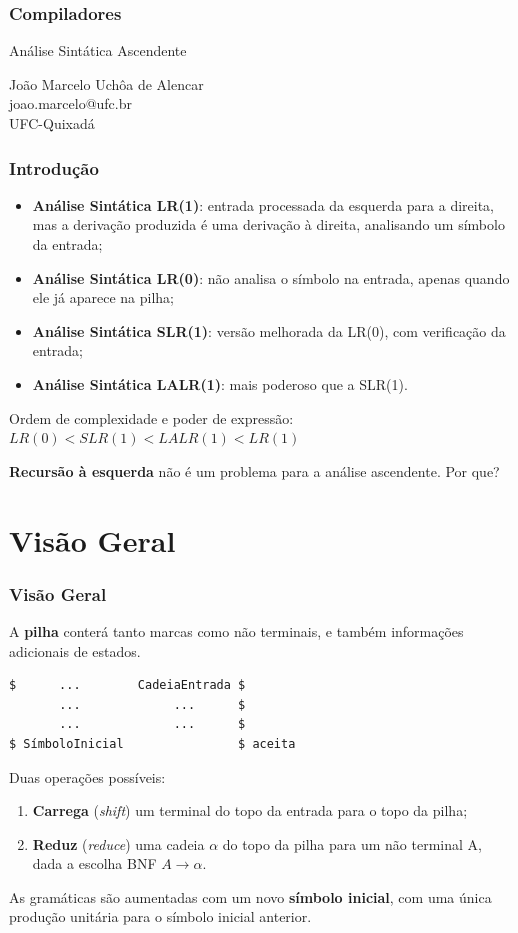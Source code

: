 \documentclass[table]{beamer}
\begin{document}
\begin{frame}
   \frametitle{Compiladores}
   \large
   \begin{center}
   Análise Sintática Ascendente
   \end{center}
   \scriptsize
   \begin{center}
      João Marcelo Uchôa de Alencar \\
      joao.marcelo@ufc.br \\
      UFC-Quixadá
   \end{center}
\end{frame}

\begin{frame}
   \frametitle{Introdução}
   \begin{itemize}
      \item \textbf{Análise Sintática LR(1)}: entrada processada da esquerda para a direita, mas a derivação produzida é uma derivação à direita, analisando um símbolo da entrada;
      \item \textbf{Análise Sintática LR(0)}: não analisa o símbolo na entrada, apenas quando ele já aparece na pilha;
      \item \textbf{Análise Sintática SLR(1)}: versão melhorada da LR(0), com verificação da entrada;
      \item \textbf{Análise Sintática LALR(1)}: mais poderoso que a SLR(1).
   \end{itemize}
   \begin{center}
   Ordem de complexidade e poder de expressão: \\
   $LR(0) < SLR(1) < LALR(1) < LR(1)$
   \end{center}
   \textbf{Recursão à esquerda} não é um problema para a análise ascendente. Por que?
\end{frame}

\begin{frame}
   \tableofcontents
\end{frame}

\section{Visão Geral}
\begin{frame}[fragile]
   \frametitle{Visão Geral}
   A \textbf{pilha} conterá tanto marcas como não terminais, e também informações adicionais de estados.
   \begin{verbatim}
$      ...        CadeiaEntrada $
       ...             ...      $
       ...             ...      $
$ SímboloInicial                $ aceita    
   \end{verbatim}
   Duas operações possíveis:
   \begin{enumerate}
      \item \textbf{Carrega} (\textit{shift}) um terminal do topo da entrada para o topo da pilha;
      \item \textbf{Reduz} (\textit{reduce})  uma cadeia $\alpha$ do topo da pilha para um não terminal A, dada a escolha BNF $A\to\alpha$.
   \end{enumerate}
   As gramáticas são aumentadas com um novo \textbf{símbolo inicial}, com uma única produção unitária para o símbolo inicial anterior.
\end{frame}
\end{document}
